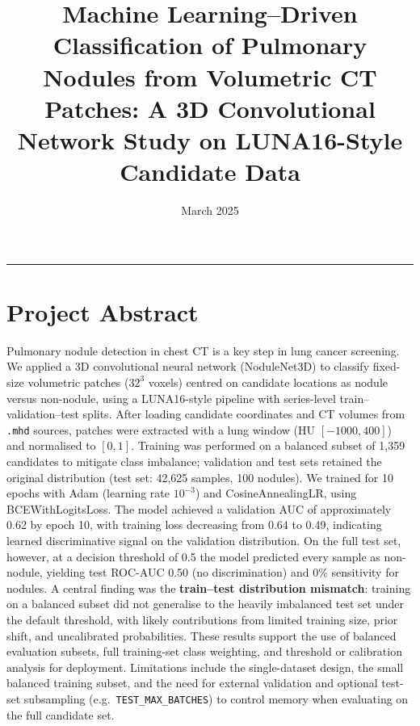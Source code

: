 \documentclass[11pt,a4paper]{article}
\title{Machine Learning--Driven Classification of Pulmonary Nodules from Volumetric CT Patches: A 3D Convolutional Network Study on LUNA16-Style Candidate Data}
\author{}
\date{March 2025}
\begin{document}
\maketitle

\begin{center}
\rule{0.9\textwidth}{0.4pt}
\end{center}

\section{Project Abstract}

Pulmonary nodule detection in chest CT is a key step in lung cancer screening. We applied a 3D convolutional neural network (NoduleNet3D) to classify fixed-size volumetric patches ($32^3$ voxels) centred on candidate locations as nodule versus non-nodule, using a LUNA16-style pipeline with series-level train--validation--test splits. After loading candidate coordinates and CT volumes from \texttt{.mhd} sources, patches were extracted with a lung window (HU $[-1000, 400]$) and normalised to $[0,1]$. Training was performed on a balanced subset of 1,359 candidates to mitigate class imbalance; validation and test sets retained the original distribution (test set: 42,625 samples, 100 nodules). We trained for 10 epochs with Adam (learning rate $10^{-3}$) and CosineAnnealingLR, using BCEWithLogitsLoss. The model achieved a validation AUC of approximately 0.62 by epoch 10, with training loss decreasing from 0.64 to 0.49, indicating learned discriminative signal on the validation distribution. On the full test set, however, at a decision threshold of 0.5 the model predicted every sample as non-nodule, yielding test ROC-AUC 0.50 (no discrimination) and 0\% sensitivity for nodules. A central finding was the \textbf{train--test distribution mismatch}: training on a balanced subset did not generalise to the heavily imbalanced test set under the default threshold, with likely contributions from limited training size, prior shift, and uncalibrated probabilities. These results support the use of balanced evaluation subsets, full training-set class weighting, and threshold or calibration analysis for deployment. Limitations include the single-dataset design, the small balanced training subset, and the need for external validation and optional test-set subsampling (e.g.\ \texttt{TEST\_MAX\_BATCHES}) to control memory when evaluating on the full candidate set.
\end{document}
